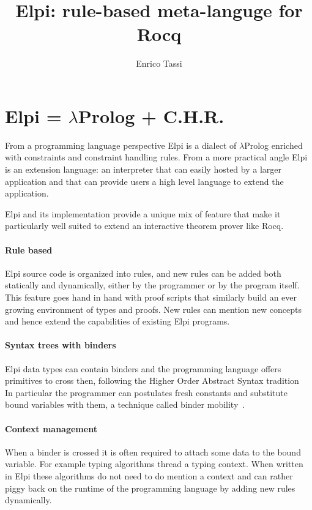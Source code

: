 \documentclass[sigplan,natbib=false]{acmart}
\author{Enrico Tassi}
\affiliation{%
    \institution{Université Côte d'Azur, Inria}
    \country{France}
}
\title{Elpi: rule-based meta-languge for Rocq}
\begin{document}
\maketitle

\section{Elpi = $\lambda$Prolog + C.H.R.}

From a programming language perspective Elpi is a dialect of
$\lambda$Prolog enriched with constraints and constraint handling rules.
From a more practical angle Elpi is an extension language: an interpreter
that can easily hosted by a larger application and that can provide users a high
level language to extend the application.

Elpi and its implementation provide a unique mix of feature that make it
particularly well suited to extend an interactive theorem prover like Rocq.

\paragraph{Rule based} Elpi source code is organized into rules, and new rules
can be added both statically and dynamically, either by the programmer or
by the program itself. This feature goes hand in hand with proof scripts
that similarly build an ever growing environment of types and proofs. New
rules can mention new concepts and hence extend the capabilities of existing
Elpi programs.

\paragraph{Syntax trees with binders} Elpi data types can contain binders and the programming
language offers primitives to cross then, following the Higher Order Abstract
Syntax tradition~\cite{10.1145/960116.54010}
In particular the programmer can
postulates fresh constants and substitute bound variables with them,
a technique called binder mobility~\cite{miller:hal-01884210}.

\paragraph{Context management} When a binder is crossed it is often required to
attach some data to the bound variable. For example typing algorithms
thread a typing context. When written in Elpi these algorithms do not need to
do mention a context and can rather piggy back on the runtime of the programming
language by adding new rules dynamically.
\end{document}
